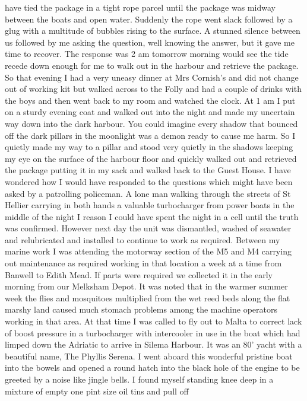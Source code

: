 have tied the package in a tight rope parcel until the package was midway
between the boats and open water. Suddenly the rope went slack followed by a
glug with a multitude of bubbles rising to the surface. A stunned silence
between us followed by me asking the question, well knowing the answer, but it
gave me time to recover. The response was 2 am tomorrow morning would see the
tide recede down enough for me to walk out in the harbour and retrieve the
package. So that evening I had a very uneasy dinner at Mrs Cornish's and did
not change out of working kit but walked across to the Folly and had a couple
of drinks with the boys and then went back to my room and watched the clock. At
1 am I put on a sturdy evening coat and walked out into the night and made my
uncertain way down into the dark harbour. You could imagine every shadow that
bounced off the dark pillars in the moonlight was a demon ready to cause me
harm. So I quietly made my way to a pillar and stood very quietly in the
shadows keeping my eye on the surface of the harbour floor and quickly walked
out and retrieved the package putting it in my sack and walked back to the
Guest House. I have wondered how I would have responded to the questions which
might have been asked by a patrolling policeman. A lone man walking through the
streets of St Hellier carrying in both hands a valuable turbocharger from power
boats in the middle of the night I reason I could have spent the night in a
cell until the truth was confirmed. However next day the unit was dismantled,
washed of seawater and relubricated and installed to continue            to
work as required. Between my marine work I was attending the motorway section
of the M5 and M4 carrying out maintenance as required working in that location
a week at a time from Banwell to Edith Mead. If parts were required we
collected it in the early morning from our Melksham Depot. It was noted that in
the warmer summer week the flies and mosquitoes multiplied from the wet reed
beds along the flat marshy land caused much stomach problems among the machine
operators working in that area. At that time I was called to fly out to Malta
to correct lack of boost pressure in a turbocharger with intercooler in use in
the boat which had limped down the Adriatic to arrive in Silema Harbour. It was
an 80' yacht with a beautiful name, The Phyllis Serena. I went aboard this
wonderful pristine boat into the bowels and opened a round hatch into the black
hole of the engine to be greeted by a noise like jingle bells. I found myself
standing knee deep in a mixture of empty one pint size oil tins and pull off
